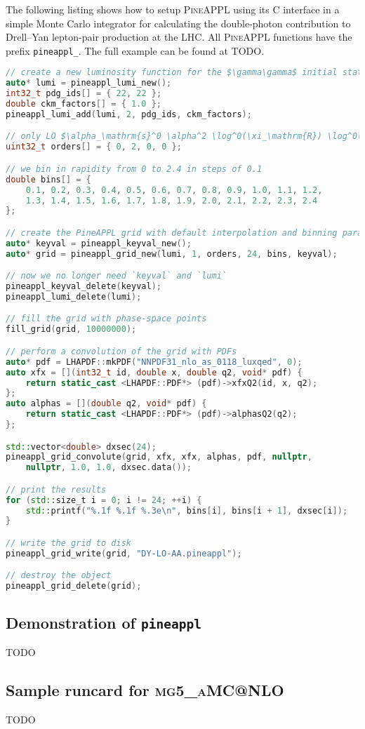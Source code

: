 The following listing shows how to setup \textsc{PineAPPL} using its C interface in a simple Monte Carlo integrator for calculating the double-photon contribution to Drell--Yan lepton-pair production at the LHC.
All \textsc{PineAPPL} functions have the prefix \texttt{pineappl\_}.
The full example can be found at TODO.
\begin{lstlisting}[language=C++,mathescape=true]
// create a new luminosity function for the $\gamma\gamma$ initial state
auto* lumi = pineappl_lumi_new();
int32_t pdg_ids[] = { 22, 22 };
double ckm_factors[] = { 1.0 };
pineappl_lumi_add(lumi, 2, pdg_ids, ckm_factors);

// only LO $\alpha_\mathrm{s}^0 \alpha^2 \log^0(\xi_\mathrm{R}) \log^0(\xi_\mathrm{F})$
uint32_t orders[] = { 0, 2, 0, 0 };

// we bin in rapidity from 0 to 2.4 in steps of 0.1
double bins[] = {
    0.1, 0.2, 0.3, 0.4, 0.5, 0.6, 0.7, 0.8, 0.9, 1.0, 1.1, 1.2,
    1.3, 1.4, 1.5, 1.6, 1.7, 1.8, 1.9, 2.0, 2.1, 2.2, 2.3, 2.4
};

// create the PineAPPL grid with default interpolation and binning parameters
auto* keyval = pineappl_keyval_new();
auto* grid = pineappl_grid_new(lumi, 1, orders, 24, bins, keyval);

// now we no longer need `keyval` and `lumi`
pineappl_keyval_delete(keyval);
pineappl_lumi_delete(lumi);

// fill the grid with phase-space points
fill_grid(grid, 10000000);

// perform a convolution of the grid with PDFs
auto* pdf = LHAPDF::mkPDF("NNPDF31_nlo_as_0118_luxqed", 0);
auto xfx = [](int32_t id, double x, double q2, void* pdf) {
    return static_cast <LHAPDF::PDF*> (pdf)->xfxQ2(id, x, q2);
};
auto alphas = [](double q2, void* pdf) {
    return static_cast <LHAPDF::PDF*> (pdf)->alphasQ2(q2);
};

std::vector<double> dxsec(24);
pineappl_grid_convolute(grid, xfx, xfx, alphas, pdf, nullptr,
    nullptr, 1.0, 1.0, dxsec.data());

// print the results
for (std::size_t i = 0; i != 24; ++i) {
    std::printf("%.1f %.1f %.3e\n", bins[i], bins[i + 1], dxsec[i]);
}

// write the grid to disk
pineappl_grid_write(grid, "DY-LO-AA.pineappl");

// destroy the object
pineappl_grid_delete(grid);
\end{lstlisting}

\subsection{Demonstration of \texorpdfstring{\texttt{pineappl}}{pineappl}}
\label{app:pineappl-demo}

TODO

\subsection{Sample runcard for \texorpdfstring{\textsc{mg5\_aMC@NLO}}{mg5\_aMC@NLO}}
\label{app:sample-runcard}

TODO
